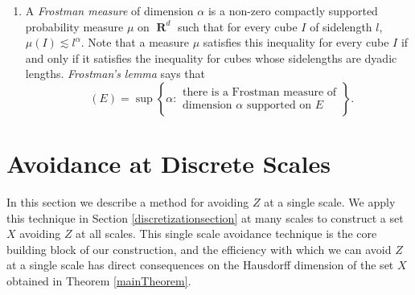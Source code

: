 \documentclass[dvipsnames,letterpaper,12pt]{article}
\numberwithin{equation}{section}
\theoremstyle{plain}
\theoremstyle{remark}
\DeclareMathOperator{\hausdim}{\dim_{\mathbf{H}}}
\DeclareMathOperator{\RR}{\mathbf{R}}
\begin{document}
\begin{enumerate}
	\item\label{defFrostmanItem} A {\it Frostman measure} of dimension $\alpha$ is a non-zero compactly supported probability measure $\mu$ on $\RR^d$ such that for every cube $I$ of sidelength $l$, $\mu(I) \lesssim l^\alpha$. Note that a measure $\mu$ satisfies this inequality for every cube $I$ if and only if it satisfies the inequality for cubes whose sidelengths are dyadic lengths. {\it Frostman's lemma} says that
	\[ \hausdim(E) = \sup \left\{ \alpha:
		\begin{array}{c}
			\text{there is a Frostman measure of}\\
			\text{dimension $\alpha$ supported on $E$}
		\end{array} \right\}. \]
\end{enumerate}









\section{Avoidance at Discrete Scales}\label{discretesection}

In this section we describe a method for avoiding $Z$ at a single scale. We apply this technique in Section \ref{discretizationsection} at many scales to construct a set $X$ avoiding $Z$ at all scales. This single scale avoidance technique is the core building block of our construction, and the efficiency with which we can avoid $Z$ at a single scale has direct consequences on the Hausdorff dimension of the set $X$ obtained in Theorem \ref{mainTheorem}.
\end{document}
